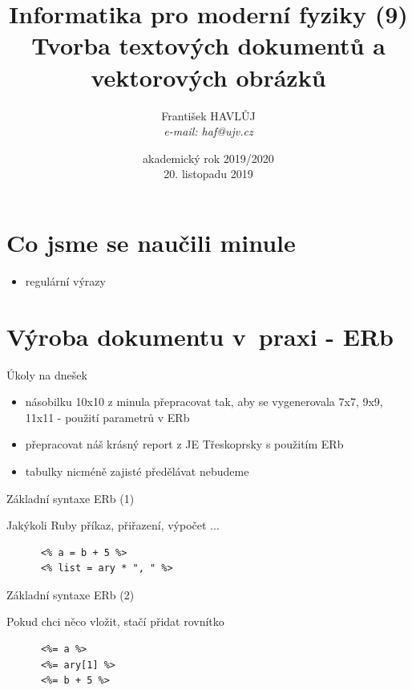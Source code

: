 \documentclass{beamer}
\title[IMF (9)]{Informatika pro moderní fyziky (9)\\Tvorba textových dokumentů a vektorových obrázků}
\author[Franti\v{s}ek HAVL\r{U}J, ORF ÚJV Řež]{Franti\v{s}ek HAVL\r{U}J\\{\scriptsize \emph{e-mail: haf@ujv.cz}}}
\date{akademický rok 2019/2020\\20. listopadu 2019}
\institute[ORF ÚJV Řež]
{ÚJV Řež\\oddělení Reaktorové fyziky a podpory palivového cyklu}
\begin{document}
\begin{frame}
  \titlepage
\end{frame}

\begin{frame}
  \tableofcontents
\end{frame}

\section{Co jsme se naučili minule}

\begin{frame}{}
  \begin{itemize}
    \item regulární výrazy
  \end{itemize}
\end{frame}

\section{Výroba dokumentu v~praxi - ERb}

\begin{frame}{Úkoly na dnešek}
  \begin{itemize}
    \item násobilku 10x10 z minula přepracovat tak, aby se vygenerovala 7x7, 9x9, 11x11 - použití parametrů v ERb
    \item přepracovat náš krásný report z JE Třeskoprsky s použitím ERb
    \item tabulky nicméně zajisté předělávat nebudeme
  \end{itemize}
\end{frame}

\begin{frame}[fragile]{Základní syntaxe ERb (1)}
  \begin{block}{ }
    Jakýkoli Ruby příkaz, přiřazení, výpočet ...
    \scriptsize
    \begin{verbatim}
      <% a = b + 5 %>
      <% list = ary * ", " %>
    \end{verbatim}
  \end{block}
\end{frame}

\begin{frame}[fragile]{Základní syntaxe ERb (2)}
  \begin{block}{ }
    Pokud chci něco vložit, stačí přidat rovnítko
    \scriptsize
    \begin{verbatim}
      <%= a %>
      <%= ary[1] %>
      <%= b + 5 %>
    \end{verbatim}
  \end{block}
\end{frame}
\end{document}
